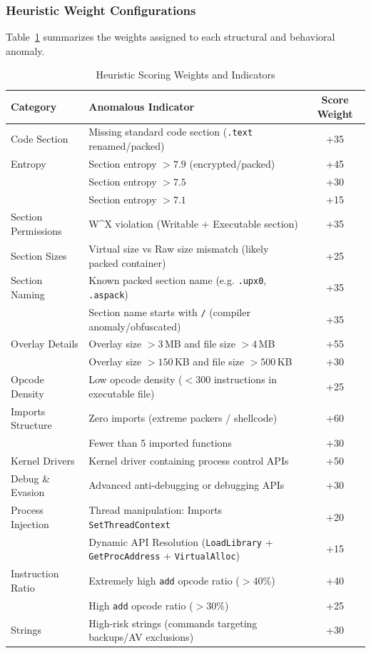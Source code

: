 \documentclass[11pt,a4paper]{article}
\begin{document}
\subsubsection{Heuristic Weight Configurations}
Table~\ref{tab:weights} summarizes the weights assigned to each structural and behavioral anomaly.

\begin{table}[h]
\centering
\caption{Heuristic Scoring Weights and Indicators}
\label{tab:weights}
\begin{tabular}{lp{10cm}c}
\toprule
\textbf{Category} & \textbf{Anomalous Indicator} & \textbf{Score Weight} \\
\midrule
Code Section & Missing standard code section (\texttt{.text} renamed/packed) & +35 \\
\midrule
Entropy & Section entropy $>7.9$ (encrypted/packed) & +45 \\
        & Section entropy $>7.5$ & +30 \\
        & Section entropy $>7.1$ & +15 \\
\midrule
Section Permissions & W\textasciicircum{}X violation (Writable + Executable section) & +35 \\
\midrule
Section Sizes & Virtual size vs Raw size mismatch (likely packed container) & +25 \\
\midrule
Section Naming & Known packed section name (e.g. \texttt{.upx0}, \texttt{.aspack}) & +35 \\
               & Section name starts with \texttt{/} (compiler anomaly/obfuscated) & +35 \\
\midrule
Overlay Details & Overlay size $>3$\,MB and file size $>4$\,MB & +55 \\
                & Overlay size $>150$\,KB and file size $>500$\,KB & +30 \\
\midrule
Opcode Density & Low opcode density ($<300$ instructions in executable file) & +25 \\
\midrule
Imports Structure & Zero imports (extreme packers / shellcode) & +60 \\
                  & Fewer than 5 imported functions & +30 \\
\midrule
Kernel Drivers & Kernel driver containing process control APIs & +50 \\
\midrule
Debug \& Evasion & Advanced anti-debugging or debugging APIs & +30 \\
\midrule
Process Injection & Thread manipulation: Imports \texttt{SetThreadContext} & +20 \\
                  & Dynamic API Resolution (\texttt{LoadLibrary} + \texttt{GetProcAddress} + \texttt{VirtualAlloc}) & +15 \\
\midrule
Instruction Ratio & Extremely high \texttt{add} opcode ratio ($>40\%$) & +40 \\
                  & High \texttt{add} opcode ratio ($>30\%$) & +25 \\
\midrule
Strings & High-risk strings (commands targeting backups/AV exclusions) & +30 \\
\bottomrule
\end{tabular}
\end{table}
\end{document}
